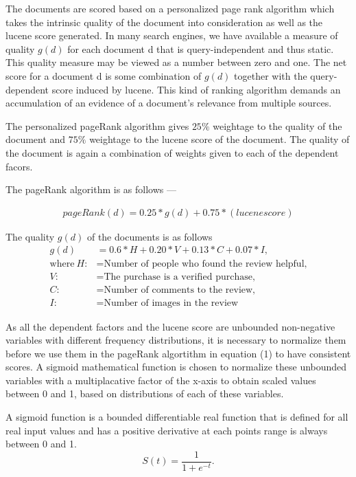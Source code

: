 \documentclass{article}
\begin{document}
The documents are scored based on a personalized page rank algorithm which takes the intrinsic quality of the document into consideration as well as the lucene score generated. In many search engines, we have available a measure of quality $g(d)$ for each document d that is query-independent and thus static. This quality measure may be viewed as a number between zero and one. The net score for a document d is some combination of $g(d)$ together with the query-dependent score induced by lucene. This kind of ranking algorithm demands an accumulation of an evidence of a document's relevance from multiple sources. 

The personalized pageRank algorithm gives $25\%$ weightage to the quality of the document and $75\%$ weightage to the lucene score of the document. The quality of the document is again a combination of weights given to each of the dependent facors.  

The pageRank algorithm is as follows ---

\begin{align}
pageRank(d) = 0.25 * g(d) + 0.75 * (lucene score)
\end{align}

The quality $g(d)$ of the documents is as follows 
\begin{align*}
g(d) &= 0.6 * H  + 0.20 * V + 0.13 * C + 0.07 * I, \\
 \text{where}~H: &= \text{Number of people who found the review helpful,} \\
 V: &= \text{The purchase is a verified purchase,} \\
 C: &= \text{Number of comments to the review,} \\
 I: &= \text{Number of images in the review}
\end{align*}

As all the dependent factors and the lucene score are unbounded non-negative variables with different frequency distributions, it is necessary to normalize them before we use them in the pageRank algortithm in equation (1) to have consistent scores. A sigmoid mathematical function is chosen to normalize these unbounded variables with a multiplacative factor of the x-axis to obtain scaled values between 0 and 1, based on distributions of each of these variables. 

A sigmoid function is a bounded differentiable real function that is defined for all real input values and has a positive derivative at each points range is always between 0 and 1. 
\begin{equation}
S(t) = \frac{1}{1 + e^{-t}}.
\end{equation}
\end{document}
